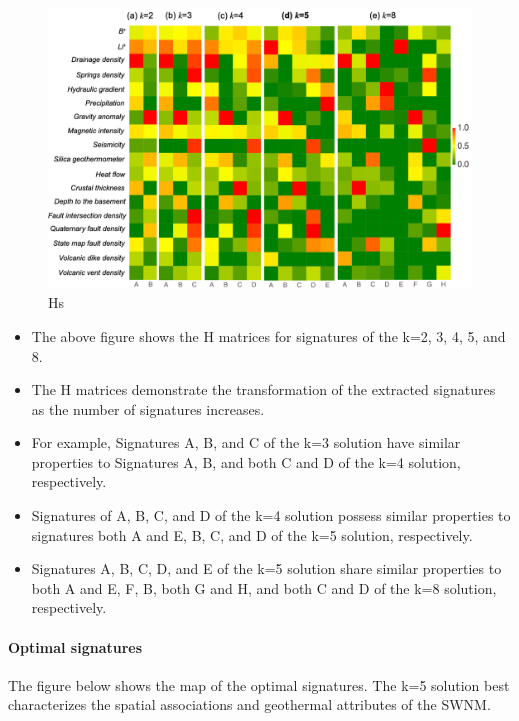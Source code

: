 \documentclass[11pt]{article}
\providecommand{\tightlist}{%
      \setlength{\itemsep}{0pt}\setlength{\parskip}{0pt}}
\begin{document}
\begin{figure}
\centering
\includegraphics{../figures-case01/signals.png}
\caption{Hs}
\end{figure}

\begin{itemize}
\tightlist
\item
  The above figure shows the H matrices for signatures of the k=2, 3, 4,
  5, and 8.
\item
  The H matrices demonstrate the transformation of the extracted
  signatures as the number of signatures increases.
\item
  For example, Signatures A, B, and C of the k=3 solution have similar
  properties to Signatures A, B, and both C and D of the k=4 solution,
  respectively.
\item
  Signatures of A, B, C, and D of the k=4 solution possess similar
  properties to signatures both A and E, B, C, and D of the k=5
  solution, respectively.
\item
  Signatures A, B, C, D, and E of the k=5 solution share similar
  properties to both A and E, F, B, both G and H, and both C and D of
  the k=8 solution, respectively.
\end{itemize}

    \hypertarget{optimal-signatures}{%
\paragraph{Optimal signatures}\label{optimal-signatures}}

The figure below shows the map of the optimal signatures. The k=5
solution best characterizes the spatial associations and geothermal
attributes of the SWNM.
\end{document}
